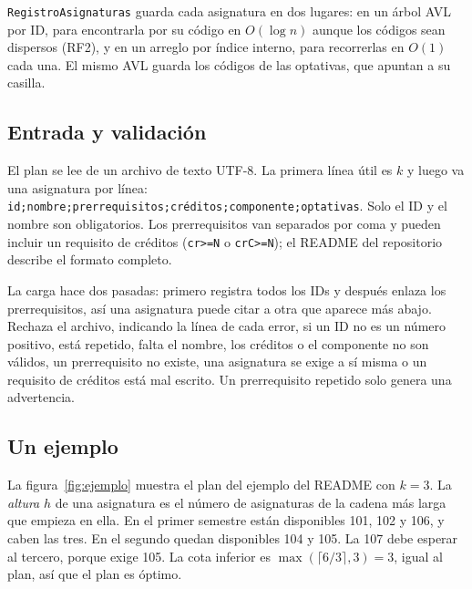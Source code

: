 \documentclass[11pt,letterpaper]{article}
\begin{document}
\texttt{RegistroAsignaturas} guarda cada asignatura en dos lugares: en un árbol AVL por ID, para encontrarla por su código en $O(\log n)$ aunque los códigos sean dispersos (RF2), y en un arreglo por índice interno, para recorrerlas en $O(1)$ cada una. El mismo AVL guarda los códigos de las optativas, que apuntan a su casilla.

\subsection{Entrada y validación}
El plan se lee de un archivo de texto UTF-8. La primera línea útil es $k$ y luego va una asignatura por línea: \texttt{id;nombre;prerrequisitos;créditos;componente;optativas}. Solo el ID y el nombre son obligatorios. Los prerrequisitos van separados por coma y pueden incluir un requisito de créditos (\texttt{cr>=N} o \texttt{crC>=N}); el README del repositorio describe el formato completo.

La carga hace dos pasadas: primero registra todos los IDs y después enlaza los prerrequisitos, así una asignatura puede citar a otra que aparece más abajo. Rechaza el archivo, indicando la línea de cada error, si un ID no es un número positivo, está repetido, falta el nombre, los créditos o el componente no son válidos, un prerrequisito no existe, una asignatura se exige a sí misma o un requisito de créditos está mal escrito. Un prerrequisito repetido solo genera una advertencia.

\subsection{Un ejemplo}
La figura~\ref{fig:ejemplo} muestra el plan del ejemplo del README con $k = 3$. La \emph{altura} $h$ de una asignatura es el número de asignaturas de la cadena más larga que empieza en ella. En el primer semestre están disponibles 101, 102 y 106, y caben las tres. En el segundo quedan disponibles 104 y 105. La 107 debe esperar al tercero, porque exige 105. La cota inferior es $\max(\lceil 6/3 \rceil, 3) = 3$, igual al plan, así que el plan es óptimo.
\end{document}
